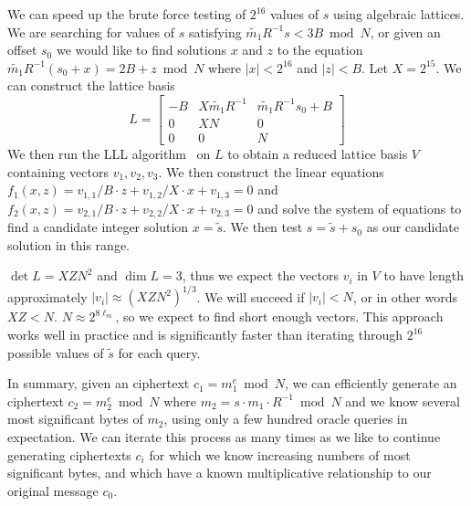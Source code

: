We can speed up the brute force testing of $2^{16}$ values of $s$ using algebraic lattices.  We are searching for values of $s$ satisfying $\tilde{m_1} R^{-1} s < 3 B \bmod N$, or given an offset $s_0$ we would like to find solutions $x$ and $z$ to the equation $\tilde{m_1} R^{-1} (s_0 + x) = 2 B + z \bmod N$ where $|x| < 2^{16}$ and $|z| < B$.  Let $X =  2^{15}$.  We can construct the lattice basis
\[
L = 
\begin{bmatrix}
-B & X\tilde{m_1} R^{-1} & \tilde{m_1} R^{-1} s_0 + B \\
0 & XN & 0 \\
0 & 0 & N
\end{bmatrix}
\]
We then run the LLL algorithm~\cite{lll} on $L$ to obtain a reduced lattice basis $V$ containing vectors $v_1, v_2, v_3$.  We then construct the linear equations $f_1(x,z) = v_{1,1}/B \cdot z +v_{1,2}/X \cdot x + v_{1,3} = 0$ and $f_2(x,z) = v_{2,1}/B \cdot z +v_{2,2}/X \cdot x + v_{2,3} = 0$ and solve the system of equations to find a candidate integer solution $x = \tilde{s}$.  We then test $s = \tilde{s} + s_0$ as our candidate solution in this range.

$\det L = XZN^2$ and $\dim L = 3$, thus we expect the vectors $v_i$ in $V$ to have length approximately $|v_i| \approx (XZN^2)^{1/3}$.  We will succeed if $|v_i| < N$, or in other words $XZ < N$.  $N \approx 2^{8\ell_m}$, so we expect to find short enough vectors. This approach works well in practice and is significantly faster than iterating through $2^{16}$ possible values of $\tilde{s}$ for each query.

In summary, given an \sslconform ciphertext $c_1 = m_1^e \bmod N$, we can efficiently generate an \sslconform ciphertext $c_2 = m_2^e \bmod N$ where $m_2 = s \cdot m_1 \cdot R^{-1} \bmod N$ and we know several most significant bytes of $m_2$, using only a few hundred oracle queries in expectation.  We can iterate this process as many times as we like to continue generating \sslconform ciphertexts $c_i$ for which we know increasing numbers of most significant bytes, and which have a known multiplicative relationship to our original message $c_0$. 

